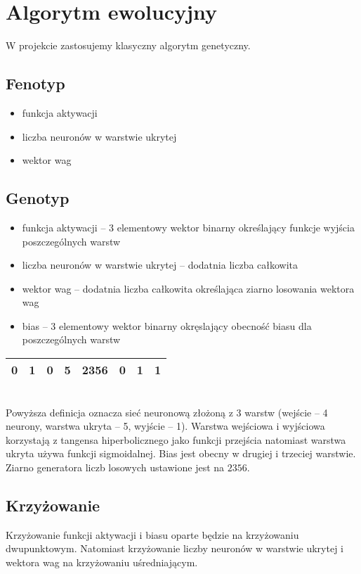 \documentclass{llncs}
\begin{document}
\section{Algorytm ewolucyjny}
W projekcie zastosujemy klasyczny algorytm genetyczny.
\subsection{Fenotyp}
\begin{itemize}
	\item funkcja aktywacji
	\item liczba neuronów w warstwie ukrytej
	\item wektor wag
\end{itemize}

\subsection{Genotyp}
\begin{itemize}
	\item funkcja aktywacji -- 3 elementowy wektor binarny określający funkcje wyjścia poszczególnych warstw
	\item liczba neuronów w warstwie ukrytej -- dodatnia liczba całkowita
	\item wektor wag -- dodatnia liczba całkowita określająca ziarno losowania wektora wag
	\item bias -- 3 elementowy wektor binarny okręslający obecność biasu dla poszczególnych warstw
\end{itemize}

\begin{example}

\begin{tabular}{ | c | c | c | c | c | c | c | c | }
	\hline
	0 & 1 & 0 & 5 & 2356 & 0 & 1 & 1\\
	\hline
\end{tabular}
\\
Powyższa definicja oznacza sieć neuronową złożoną z 3 warstw 
(wejście -- 4 neurony, warstwa ukryta -- 5, wyjście -- 1).
Warstwa wejściowa i wyjściowa korzystają z tangensa hiperbolicznego jako funkcji przejścia natomiast 
warstwa ukryta używa funkcji sigmoidalnej. Bias jest obecny w drugiej i trzeciej warstwie. Ziarno
generatora liczb losowych ustawione jest na $2356$.
\end{example}

\subsection{Krzyżowanie}
Krzyżowanie funkcji aktywacji i biasu oparte będzie na krzyżowaniu dwupunktowym. Natomiast
krzyżowanie liczby neuronów w warstwie ukrytej i wektora wag na krzyżowaniu uśredniającym.
\end{document}
